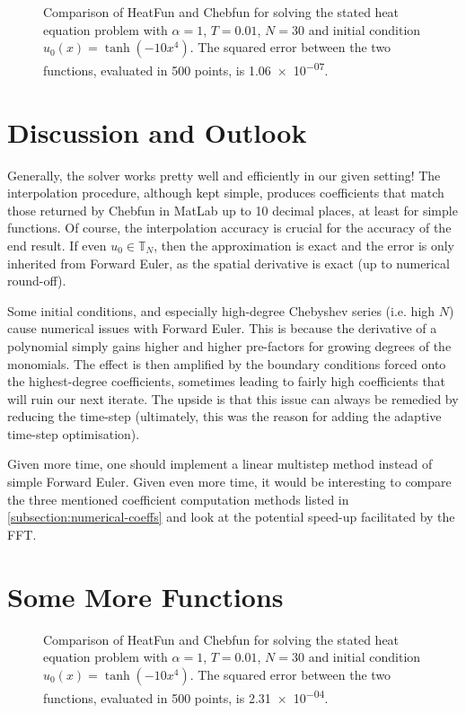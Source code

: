 \documentclass[12pt, a4paper]{article}
\begin{document}
  \begin{figure}[H]
    \centering
    \caption{Comparison of HeatFun and Chebfun for solving the stated heat equation problem with $\alpha = 1$, $T = 0.01$, $N = 30$ and initial condition $u_0(x) = \tanh(-10x^4)$. The squared error between the two functions, evaluated in 500 points, is \num{1.06e-07}.}
  \end{figure}

  \section{Discussion and Outlook}
  Generally, the solver works pretty well and efficiently in our given setting!
  The interpolation procedure, although kept simple, produces coefficients that match those returned by Chebfun in MatLab up to 10 decimal places, at least for simple functions.
  Of course, the interpolation accuracy is crucial for the accuracy of the end result.
  If even $u_0 \in \mathbb{T}_N$, then the approximation is exact and the error is only inherited from Forward Euler, as the spatial derivative is exact (up to numerical round-off).

  Some initial conditions, and especially high-degree Chebyshev series (i.e. high $N$) cause numerical issues with Forward Euler.
  This is because the derivative of a polynomial simply gains higher and higher pre-factors for growing degrees of the monomials.
  The effect is then amplified by the boundary conditions forced onto the highest-degree coefficients, sometimes leading to fairly high coefficients that will ruin our next iterate.
  The upside is that this issue can always be remedied by reducing the time-step (ultimately, this was the reason for adding the adaptive time-step optimisation).

  Given more time, one should implement a linear multistep method instead of simple Forward Euler.
  Given even more time, it would be interesting to compare the three mentioned coefficient computation methods listed in \cref{subsection:numerical-coeffs} and look at the potential speed-up facilitated by the FFT.

  \printbibliography

  \appendix
  \section{Some More Functions}
  \begin{figure}[H]
    \centering
    \caption{Comparison of HeatFun and Chebfun for solving the stated heat equation problem with $\alpha = 1$, $T = 0.01$, $N = 30$ and initial condition $u_0(x) = \tanh(-10x^4)$. The squared error between the two functions, evaluated in 500 points, is \num{2.31e-04}.}
  \end{figure}
\end{document}
